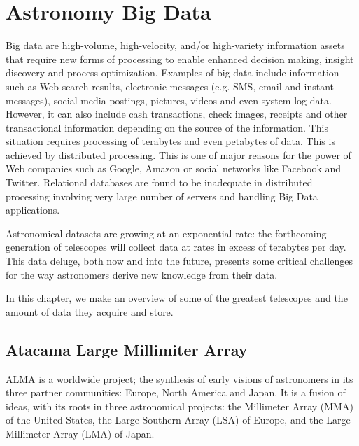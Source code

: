 \chapter{Astronomy Big Data}\label{theproblem}


Big data are high-volume, high-velocity, and/or high-variety information assets that require new forms of processing to enable enhanced decision making, insight discovery and process optimization. Examples of big data include information such as Web search results, electronic messages (e.g. SMS, email and instant messages), social media postings, pictures, videos and even system log data. However, it can also include cash transactions, check images, receipts and other transactional information depending on the source of the information. This situation requires processing of terabytes and even petabytes of data. This is achieved by distributed processing. This is one of major reasons for the power of Web companies such as
Google, Amazon or social networks like Facebook and Twitter. Relational databases are found to be inadequate in distributed processing involving very large number of servers and handling Big Data applications. \newline

Astronomical datasets are growing at an exponential rate: the forthcoming generation of telescopes will collect data at rates in excess of terabytes per day. This data deluge, both now and into the future, presents some critical challenges for the way astronomers derive new knowledge from their data. \newline

In this chapter, we make an overview of some of the greatest telescopes and the amount of data they acquire and store.


\section{Atacama Large Millimiter Array}

ALMA is a worldwide project; the synthesis of early visions of astronomers in its three partner communities: Europe, North America and Japan. It is a fusion of ideas, with its roots in three astronomical projects: the Millimeter Array (MMA) of the United States, the Large Southern Array (LSA) of Europe, and the Large Millimeter Array (LMA) of Japan.



